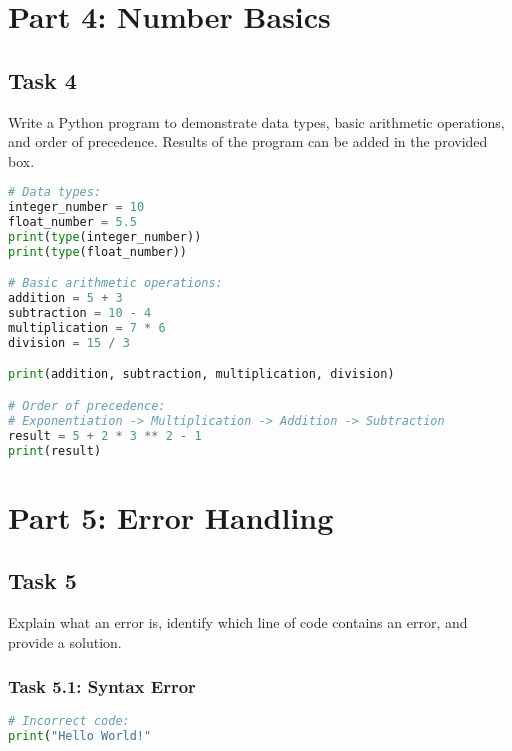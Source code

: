 \documentclass[11pt]{article}
\begin{document}
\section*{Part 4: Number Basics}

\subsection*{Task 4}
Write a Python program to demonstrate data types, basic arithmetic operations, and order of precedence. Results of the program can be added in the provided box.

\begin{lstlisting}[language=Python]
# Data types:
integer_number = 10
float_number = 5.5
print(type(integer_number))
print(type(float_number))  

# Basic arithmetic operations:
addition = 5 + 3
subtraction = 10 - 4
multiplication = 7 * 6
division = 15 / 3

print(addition, subtraction, multiplication, division)

# Order of precedence:
# Exponentiation -> Multiplication -> Addition -> Subtraction
result = 5 + 2 * 3 ** 2 - 1  
print(result)
\end{lstlisting}


\begin{tcolorbox}[colback=black!10!white, colframe=black!75!white, title=\textbf{Answer}]
    \vspace{2cm}
\end{tcolorbox}
    

\section*{Part 5: Error Handling}

\subsection*{Task 5}
Explain what an error is, identify which line of code contains an error, and provide a solution.

\subsubsection*{Task 5.1: Syntax Error}
\begin{lstlisting}[language=Python]
# Incorrect code:
print("Hello World!"
\end{lstlisting}

\begin{tcolorbox}[colback=black!10!white, colframe=black!75!white, title=\textbf{Answer}]
    \vspace{1cm}
\end{tcolorbox}
    
\end{document}
